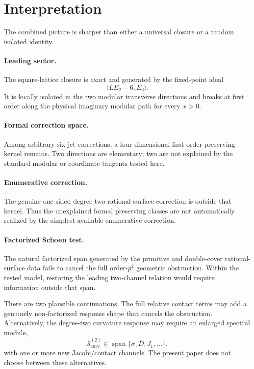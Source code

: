 \documentclass[11pt]{article}
\theoremstyle{definition}
\theoremstyle{remark}
\newcommand{\bsigma}{\overline{\sigma}}
\newcommand{\bD}{\overline{D}}
\newcommand{\bSc}{\overline{\mathcal{S}}_{\mathrm{curv}}}
\newcommand{\Span}{\operatorname{span}}
\begin{document}
\section{Interpretation}

The combined picture is sharper than either a universal closure or a random isolated identity.

\paragraph{Leading sector.}
The square-lattice closure is exact and generated by the fixed-point ideal
\[
 \langle LE_2-6,E_6\rangle.
\]
It is locally isolated in the two modular transverse directions and breaks at first order along the physical imaginary modular path for every \(x>0\).

\paragraph{Formal correction space.}
Among arbitrary six-jet corrections, a four-dimensional first-order preserving kernel remains.  Two directions are elementary; two are not explained by the standard modular or coordinate tangents tested here.

\paragraph{Enumerative correction.}
The genuine one-sided degree-two rational-surface correction is outside that kernel.  Thus the unexplained formal preserving classes are not automatically realized by the simplest available enumerative correction.

\paragraph{Factorized Schoen test.}
The natural factorized span generated by the primitive and double-cover rational-surface data fails to cancel the full order-\(p^2\) geometric obstruction.  Within the tested model, restoring the leading two-channel relation would require information outside that span.

There are two plausible continuations.  The full relative contact terms may add a genuinely non-factorized response shape that cancels the obstruction.  Alternatively, the degree-two curvature response may require an enlarged spectral module,
\[
 \bSc^{(2)}\in\Span\{\bsigma,\bD,J_1,\ldots\},
\]
with one or more new Jacobi/contact channels.  The present paper does not choose between these alternatives.
\end{document}
